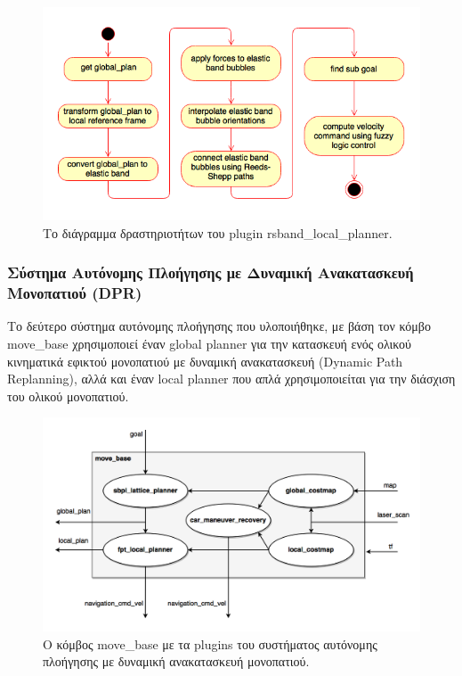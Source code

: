 \begin{figure}[!ht]
	\centering
	\includegraphics[width=0.7\linewidth]{Chapters/Chapter4/Figures/rsband_activity_diagram.png}
	\caption{Το διάγραμμα δραστηριοτήτων του plugin rsband{\_}local{\_}planner.}
	\label{fig:rsband_activity_diagram}
\end{figure}

\subsubsection{Σύστημα Αυτόνομης Πλοήγησης με Δυναμική Ανακατασκευή Μονοπατιού (DPR)}
Το δεύτερο σύστημα αυτόνομης πλοήγησης που υλοποιήθηκε, με βάση τον κόμβο move{\_}base χρησιμοποιεί έναν global planner για την κατασκευή ενός ολικού κινηματικά εφικτού μονοπατιού με δυναμική ανακατασκευή (Dynamic Path Replanning), αλλά και έναν local planner που απλά χρησιμοποιείται για την διάσχιση του ολικού μονοπατιού.

\begin{figure}[!ht]
	\centering
	\includegraphics[width=\linewidth]{Chapters/Chapter4/Figures/navigation_2_plugins.png}
	\caption{Ο κόμβος move{\_}base με τα plugins του συστήματος αυτόνομης πλοήγησης με δυναμική ανακατασκευή μονοπατιού.}
	\label{fig:navigation_2_plugins}
\end{figure}

